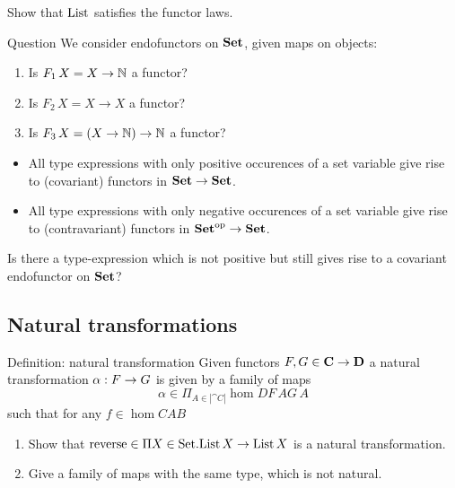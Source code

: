 \documentclass[handout]{beamer}
\begin{document}
\begin{frame}
  \begin{exercise}
    Show that $\mathrm{List}$ satisfies the functor laws.
  \end{exercise}

  \begin{block}{Question}
    We consider endofunctors on $\mathbf{Set}$, given maps on objects:
    \begin{enumerate}
    \item Is $F_1\,X = X \to \mathbb{N}$ a functor?

    \item Is $F_2\,X = X \to X$ a functor?

    \item Is $F_3\,X = (X \to \mathbb{N}) \to \mathbb{N}$ a functor?
    \end{enumerate}
  \end{block}

  \begin{itemize}
  \item All type expressions with only positive occurences of a set
    variable give rise to (covariant) functors in $\mathbf{Set} \to \mathbf{Set}$.

  \item All type expressions with only negative occurences of a set
    variable give rise to (contravariant) functors in $\mathbf{Set}^{\mathrm{op}} \to \mathbf{Set}$.
  \end{itemize}
  \begin{exercise}
    Is there a type-expression which is not positive but still gives
    rise to a covariant endofunctor on $\mathbf{Set}$?
  \end{exercise}

\end{frame}

\subsection{Natural transformations}


\begin{frame}
  \begin{block}{Definition: natural transformation}
    Given functors $F,G \in \mathbf{C} \to \mathbf{D}$ a natural
    transformation $\alpha : F \to G$ is given by a family of maps
    \[ \alpha \in \Pi_{A\in|\cat{C}|} \hom{D}{F\,A}{G\,A} \]
    such that for any $f\in \hom{C}{A}{B}$
  \end{block}
  \begin{exercise}
    \begin{enumerate}
    \item Show that $\mathrm{reverse} \in \Pi X\in\mathrm{Set}.\mathrm{List}\,X \to
      \mathrm{List}\, X$ is a natural transformation.
      
    \item Give a family of maps with the same type, which is not
      natural.
    \end{enumerate}
  \end{exercise}

\end{frame}
\end{document}
